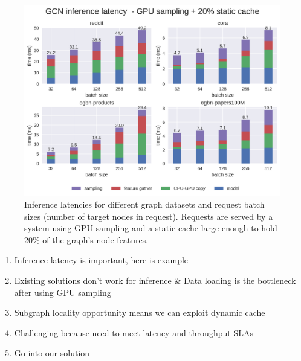 \begin{figure}[h!]
    \centering
    \includegraphics[width=\textwidth]{figures/GCN_latency_breakdown_gpu_sampled_with_cache.png}
    
    \caption{Inference latencies for different graph datasets and request batch sizes (number of target nodes in request). Requests are served by a system using GPU sampling and a static cache large enough to hold 20\% of the graph's node features.}
    \label{GPU Sampling Latency Breakdown}
\end{figure}    

\begin{enumerate}
    \item Inference latency is important, here is example
    \item Existing solutions don't work for inference \& 
         Data loading is the bottleneck after using GPU sampling
    \item Subgraph locality opportunity means we can exploit dynamic cache
    \item Challenging because need to meet latency and throughput SLAs
    \item Go into our solution
\end{enumerate}



